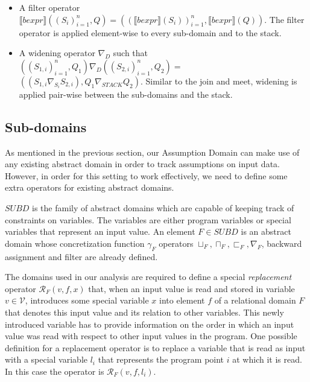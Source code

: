 \documentclass[10pt]{report}
\begin{document}
\begin{itemize}
	\item A filter operator $ \llbracket bexpr \rrbracket ((S_{i})_{i=1}^{n}, Q) =  ((\llbracket bexpr \rrbracket(S_{i}))_{i=1}^{n}, \llbracket bexpr \rrbracket(Q)). $ The filter operator is applied element-wise to every sub-domain and to the stack.
	\item A widening operator $\nabla_{D}$ such that $ ((S_{1,i})_{i=1}^{n}, Q_{1}) \nabla_{D} ((S_{2,i})_{i=1}^{n}, Q_{2}) = $ $ ((S_{1, i} \nabla_{S_{i}} S_{2,i}), Q_{1} \nabla_{STACK} Q_{2}) .$ Similar to the join and meet, widening is applied pair-wise between the sub-domains and the stack. 
\end{itemize}

\subsection{Sub-domains} \label{sub-domains}

As mentioned in the previous section, our Assumption Domain can make use of any existing abstract domain in order to track assumptions on input data. However, in order for this setting to work effectively, we need to define some extra operators for existing abstract domains. 

$SUBD$ is the family of abstract domains which are capable of keeping track of constraints on variables. The variables are either program variables or special variables that represent an input value. An element $F \in SUBD$ is an abstract domain whose concretization function $\gamma_{F}$ operators $\sqcup_{F}, \sqcap_{F}, \sqsubset_{F}, \nabla_{F}$, backward assignment and filter are already defined.
 
The domains used in our analysis are required to define a special \textit{replacement} operator $ \mathcal{R}_{F}(v, f, x) $ that, when an input value is read and stored in variable $ v \in \mathcal{V} $, introduces some special variable $ x $ into element $ f $ of a relational domain $ F $ that denotes this input value and its relation to other variables. This newly introduced variable has to provide information on the order in which an input value was read with respect to other input values in the program. One possible definition for a replacement operator is to replace a variable that is read as input with a special variable $ l_{i} $ that represents the program point $ i $ at which it is read. In this case the operator is $ \mathcal{R}_{F}(v, f, l_{i}) $. 
\end{document}
